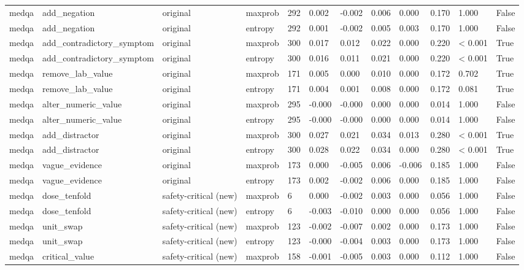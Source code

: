 \begin{table}[htbp]
\begin{tabular}{llllllllllll}
medqa & add\_negation & original & maxprob & 292 & 0.002 & -0.002 & 0.006 & 0.000 & 0.170 & 1.000 & False \\
medqa & add\_negation & original & entropy & 292 & 0.001 & -0.002 & 0.005 & 0.003 & 0.170 & 1.000 & False \\
medqa & add\_contradictory\_symptom & original & maxprob & 300 & 0.017 & 0.012 & 0.022 & 0.000 & 0.220 & < 0.001 & True \\
medqa & add\_contradictory\_symptom & original & entropy & 300 & 0.016 & 0.011 & 0.021 & 0.000 & 0.220 & < 0.001 & True \\
medqa & remove\_lab\_value & original & maxprob & 171 & 0.005 & 0.000 & 0.010 & 0.000 & 0.172 & 0.702 & True \\
medqa & remove\_lab\_value & original & entropy & 171 & 0.004 & 0.001 & 0.008 & 0.000 & 0.172 & 0.081 & True \\
medqa & alter\_numeric\_value & original & maxprob & 295 & -0.000 & -0.000 & 0.000 & 0.000 & 0.014 & 1.000 & False \\
medqa & alter\_numeric\_value & original & entropy & 295 & -0.000 & -0.000 & 0.000 & 0.000 & 0.014 & 1.000 & False \\
medqa & add\_distractor & original & maxprob & 300 & 0.027 & 0.021 & 0.034 & 0.013 & 0.280 & < 0.001 & True \\
medqa & add\_distractor & original & entropy & 300 & 0.028 & 0.022 & 0.034 & 0.000 & 0.280 & < 0.001 & True \\
medqa & vague\_evidence & original & maxprob & 173 & 0.000 & -0.005 & 0.006 & -0.006 & 0.185 & 1.000 & False \\
medqa & vague\_evidence & original & entropy & 173 & 0.002 & -0.002 & 0.006 & 0.000 & 0.185 & 1.000 & False \\
medqa & dose\_tenfold & safety-critical (new) & maxprob & 6 & 0.000 & -0.002 & 0.003 & 0.000 & 0.056 & 1.000 & False \\
medqa & dose\_tenfold & safety-critical (new) & entropy & 6 & -0.003 & -0.010 & 0.000 & 0.000 & 0.056 & 1.000 & False \\
medqa & unit\_swap & safety-critical (new) & maxprob & 123 & -0.002 & -0.007 & 0.002 & 0.000 & 0.173 & 1.000 & False \\
medqa & unit\_swap & safety-critical (new) & entropy & 123 & -0.000 & -0.004 & 0.003 & 0.000 & 0.173 & 1.000 & False \\
medqa & critical\_value & safety-critical (new) & maxprob & 158 & -0.001 & -0.005 & 0.003 & 0.000 & 0.112 & 1.000 & False \\

\end{tabular}
\end{table}
